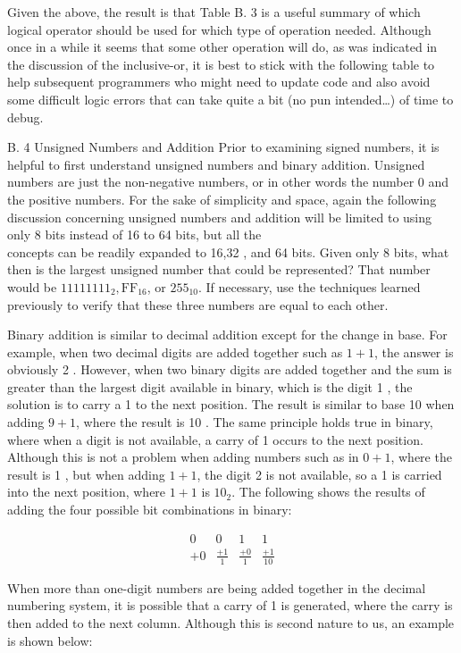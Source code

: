 \documentclass[10pt]{book}
\begin{document}
Given the above, the result is that Table B. 3 is a useful summary of which logical operator should be used for which type of operation needed. Although once in a while it seems that some other operation will do, as was indicated in the discussion of the inclusive-or, it is best to stick with the following table to help subsequent programmers who might need to update code and also avoid some difficult logic errors that can take quite a bit (no pun intended…) of time to debug.

B. 4 Unsigned Numbers and Addition
Prior to examining signed numbers, it is helpful to first understand unsigned numbers and binary addition. Unsigned numbers are just the non-negative numbers, or in other words the number 0 and the positive numbers. For the sake of simplicity and space, again the following discussion concerning unsigned numbers and addition will be limited to using only 8 bits instead of 16 to 64 bits, but all the\\
concepts can be readily expanded to 16,32 , and 64 bits. Given only 8 bits, what then is the largest unsigned number that could be represented? That number would be $11111111_{2}, \mathrm{FF}_{16}$, or $255_{10}$. If necessary, use the techniques learned previously to verify that these three numbers are equal to each other.

Binary addition is similar to decimal addition except for the change in base. For example, when two decimal digits are added together such as $1+1$, the answer is obviously 2 . However, when two binary digits are added together and the sum is greater than the largest digit available in binary, which is the digit 1 , the solution is to carry a 1 to the next position. The result is similar to base 10 when adding $9+1$, where the result is 10 . The same principle holds true in binary, where when a digit is not available, a carry of 1 occurs to the next position. Although this is not a problem when adding numbers such as in $0+1$, where the result is 1 , but when adding $1+1$, the digit 2 is not available, so a 1 is carried into the next position, where $1+1$ is $10_{2}$. The following shows the results of adding the four possible bit combinations in binary:

$$
\begin{array}{rrrr}
0 & 0 & 1 & 1 \\
+0 & \frac{+1}{1} & \frac{+0}{1} & \frac{+1}{10}
\end{array}
$$

When more than one-digit numbers are being added together in the decimal numbering system, it is possible that a carry of 1 is generated, where the carry is then added to the next column. Although this is second nature to us, an example is shown below:
\end{document}
